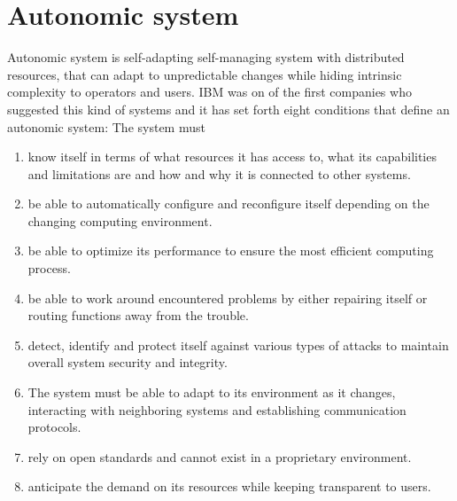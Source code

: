 \section{Autonomic system}
Autonomic system is self-adapting self-managing system with distributed resources, that can adapt to unpredictable changes while hiding intrinsic complexity to operators and users. 
IBM was on of the first companies who suggested this kind of systems and it has set forth eight conditions that define an autonomic system:
The system must
\begin{enumerate}
    \item know itself in terms of what resources it has access to, what its capabilities and limitations are and how and why it is connected to other systems.
    \item be able to automatically configure and reconfigure itself depending on the changing computing environment.
    \item be able to optimize its performance to ensure the most efficient computing process.
    \item be able to work around encountered problems by either repairing itself or routing functions away from the trouble.
    \item detect, identify and protect itself against various types of attacks to maintain overall system security and integrity.
    \item The system must be able to adapt to its environment as it changes, interacting with neighboring systems and establishing communication protocols.
    \item rely on open standards and cannot exist in a proprietary environment.
    \item anticipate the demand on its resources while keeping transparent to users.
\end{enumerate}

